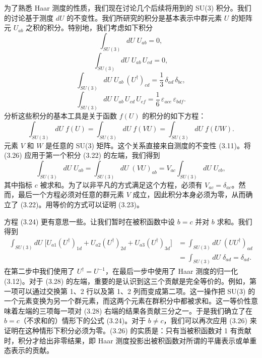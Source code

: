 为了熟悉 Haar 测度的性质，我们现在讨论几个后续将用到的 SU(3) 积分。我们的讨论基于测度 $dU$ 的不变性。我们所研究的积分是基本表示中群元素 $U$ 的矩阵元 $U_{ab}$ 之积的积分。特别地，我们考虑如下积分
\begin{equation}
  \int_{SU(3)} dU\; U_{ab} = 0 ,
\end{equation}
\begin{equation}
  \int_{SU(3)} dU\; U_{ab}\, U_{cd} = 0 ,
\end{equation}
\begin{equation}
  \int_{SU(3)} dU\; U_{ab}\, (U^\dagger)_{cd} = \frac{1}{3}\,\delta_{ad}\,\delta_{bc} ,
\end{equation}
\begin{equation}
  \int_{SU(3)} dU\; U_{ab}\, U_{cd}\, U_{ef} = \frac{1}{6}\,\varepsilon_{ace}\,\varepsilon_{bdf} .
\end{equation}
分析这些积分的基本工具是关于函数 $f(U)$ 的积分的如下方程：
\begin{equation}
  \int_{SU(3)} dU\; f(U)
  = \int_{SU(3)} dU\; f(VU)
  = \int_{SU(3)} dU\; f(UW) .
\end{equation}
元素 $V$ 和 $W$ 是任意的 SU(3) 矩阵。这个关系直接来自测度的不变性 (3.11)。将 (3.26) 应用于第一个积分 (3.22) 的左端，我们得到
\begin{equation}
  \int_{SU(3)} dU\; U_{ab}
  = \int_{SU(3)} dU\; (VU)_{ab}
  = V_{ac}\int_{SU(3)} dU\; U_{cb} ,
\end{equation}
其中指标 $c$ 被求和。为了以非平凡的方式满足这个方程，必须有 $V_{ac} = \delta_{ac}$。然而，最后一个方程必须对任意的群元素 $V$ 成立，因此积分本身必须为零，从而确立了 (3.22)。用等价的方式可以证明 (3.23)。

方程 (3.24) 更有意思一些。让我们暂时在被积函数中设 $b = c$ 并对 $b$ 求和。我们得到
\begin{equation}
  \begin{split}
    \int_{SU(3)} dU\;\big[ U_{a1}(U^\dagger)_{1d} + U_{a2}(U^\dagger)_{2d} + U_{a3}(U^\dagger)_{3d} \big]
    &= \int_{SU(3)} dU\; (UU^\dagger)_{ad}\\
    &= \int_{SU(3)} dU\; \delta_{ad} = \delta_{ad} .
  \end{split}
\end{equation}
在第二步中我们使用了 $U^\dagger = U^{-1}$，在最后一步中使用了 Haar 测度的归一化 (3.12)。对于 (3.28) 的左端，重要的是认识到这三个贡献是完全等价的。例如，第一项可以通过交换第 1、2 行以及第 1、2 列而变成第二项。这一操作把 SU(3) 的一个元素变换为另一个群元素，而这两个元素在群积分中都被求和。这一等价性意味着左端的三项每一项对 (3.28) 右端的结果各贡献三分之一。于是我们确立了在 $b = c$（不求和的）情形下的公式 (3.24)。对于 $b \neq c$，我们可以再次应用 (3.26) 来证明在这种情形下积分必须为零。(3.26) 的实质是：只有当被积函数对 1 有贡献时，积分才给出非零结果，即 Haar 测度投影出被积函数对所谓的平庸表示或单重态表示的贡献。

